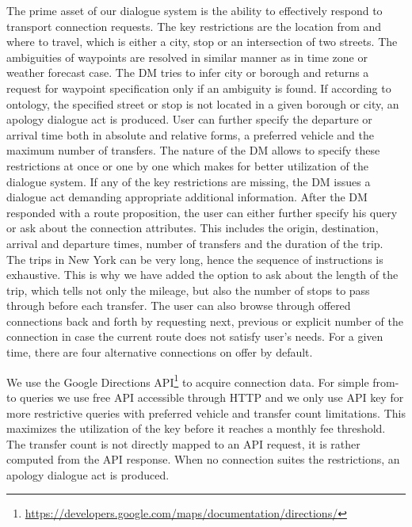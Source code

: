 The prime asset of our dialogue system is the ability to effectively respond to transport connection requests.
The key restrictions are the location from and where to travel, which is either a city, stop or an intersection of two streets.
The ambiguities of waypoints are resolved in similar manner as in time zone or weather forecast case.
The DM tries to infer city or borough and returns a request for waypoint specification only if an ambiguity is found.
If according to ontology, the specified street or stop is not located in a given borough or city, an apology dialogue act is produced.
User can further specify the departure or arrival time both in absolute and relative forms, a preferred vehicle and the maximum number of transfers.
The nature of the DM allows to specify these restrictions at once or one by one which makes for better utilization of the dialogue system.
If any of the key restrictions are missing, the DM issues a dialogue act demanding appropriate additional information.
After the DM responded with a route proposition, the user can either further specify his query or ask about the connection attributes.
This includes the origin, destination, arrival and departure times, number of transfers and the duration of the trip.
The trips in New York can be very long, hence the sequence of instructions is exhaustive.
This is why we have added the option to ask about the length of the trip, which tells not only the mileage, but also the number of stops to pass through before each transfer.
The user can also browse through offered connections back and forth by requesting next, previous or explicit number of the connection in case the current route does not satisfy user's needs.
For a given time, there are four alternative connections on offer by default.

We use the Google Directions API\footnote{\url{https://developers.google.com/maps/documentation/directions/}} to acquire connection data.
For simple from-to queries we use free API accessible through HTTP and we only use API key for more restrictive queries with preferred vehicle and transfer count limitations.
This maximizes the utilization of the key before it reaches a monthly fee threshold.
The transfer count is not directly mapped to an API request, it is rather computed from the API response.
When no connection suites the restrictions, an apology dialogue act is produced.




